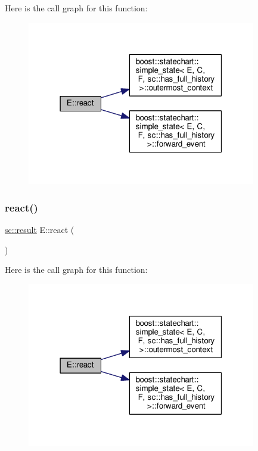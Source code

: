 Here is the call graph for this function\+:
\nopagebreak
\begin{figure}[H]
\begin{center}
\leavevmode
\includegraphics[width=283pt]{struct_e_ad7041b738a0be26a38c6467bafb53887_cgraph}
\end{center}
\end{figure}
\mbox{\label{struct_e_ae2ee0692466ac592be4c04630cdc69ec}} 
\subsubsection{\texorpdfstring{react()}{react()}\hspace{0.1cm}{\footnotesize\ttfamily [3/4]}}
{\footnotesize\ttfamily \mbox{\hyperlink{namespaceboost_1_1statechart_abe807f6598b614d6d87bb951ecd92331}{sc\+::result}} E\+::react (\begin{DoxyParamCaption}\item[{const \mbox{\hyperlink{struct_ev_discard_in_b}{Ev\+Discard\+InB}} \&}]{ }\end{DoxyParamCaption})\hspace{0.3cm}{\ttfamily [inline]}}

Here is the call graph for this function\+:
\nopagebreak
\begin{figure}[H]
\begin{center}
\leavevmode
\includegraphics[width=283pt]{struct_e_ae2ee0692466ac592be4c04630cdc69ec_cgraph}
\end{center}
\end{figure}
\mbox{\label{struct_e_a12a9677bb416edbfde60653d5d587430}} 
